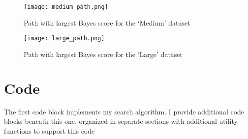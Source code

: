 \documentclass[twoside,11pt]{article}
\begin{document}
\begin{figure}[h]
    \centering
    \texttt{[image: medium\_path.png]}
    \caption{Path with largest Bayes score for the `Medium' dataset}
\end{figure}

\begin{figure}[h]
    \centering
    \texttt{[image: large\_path.png]}
    \caption{Path with largest Bayes score for the `Large' dataset}
\end{figure}




\section{Code}
The first code block  implements my search algorithm. I provide additional code blocks beneath this one, organized in separate sections with additional utility functions to support this code
\end{document}
